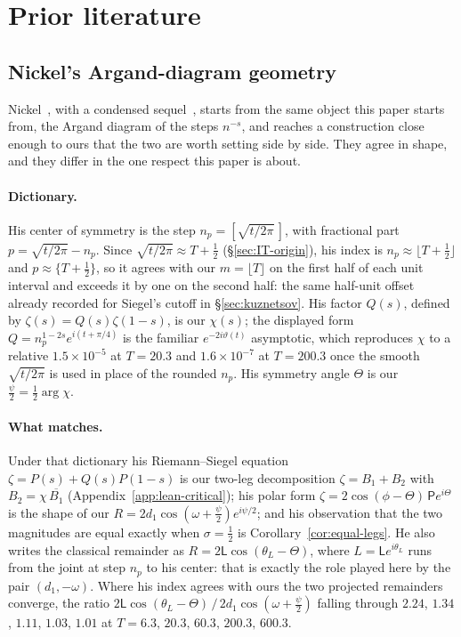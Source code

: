 \documentclass[11pt]{article}
\theoremstyle{definition}
\begin{document}
\section{Prior literature}\label{sec:prior-lit}

\subsection{Nickel's Argand-diagram geometry}\label{sec:nickel}

Nickel~\cite{Nickel2013}, with a condensed sequel~\cite{Nickel2015}, starts
from the same object this paper starts from,
the Argand diagram of the steps $n^{-s}$, and reaches a construction close
enough to ours that the two are worth setting side by side. They agree in
shape, and they differ in the one respect this paper is about.

\paragraph{Dictionary.} His center of symmetry is the step
$n_p=[\sqrt{t/2\pi}\,]$, with fractional part $p=\sqrt{t/2\pi}-n_p$. Since
$\sqrt{t/2\pi}\approx T+\tfrac12$ (\S\ref{sec:IT-origin}), his index is
$n_p\approx\lfloor T+\tfrac12\rfloor$ and $p\approx\{T+\tfrac12\}$, so it
agrees with our $m=\lfloor T\rfloor$ on the first half of each unit interval
and exceeds it by one on the second half: the same half-unit offset already
recorded for Siegel's cutoff in \S\ref{sec:kuznetsov}. His factor $Q(s)$,
defined by $\zeta(s)=Q(s)\zeta(1-s)$, is our $\chi(s)$; the displayed form
$Q=n_p^{1-2s}e^{i(t+\pi/4)}$ is the familiar $e^{-2i\vartheta(t)}$ asymptotic,
which reproduces $\chi$ to a relative $1.5\times10^{-5}$ at $T=20.3$ and
$1.6\times10^{-7}$ at $T=200.3$ once the smooth $\sqrt{t/2\pi}$ is used in
place of the rounded $n_p$. His symmetry angle $\Theta$ is our
$\tfrac{\psi}{2}=\tfrac12\arg\chi$.

\paragraph{What matches.} Under that dictionary his Riemann--Siegel equation
$\zeta=P(s)+Q(s)P(1-s)$ is our two-leg decomposition $\zeta=B_1+B_2$ with
$B_2=\chi\,\overline{B_1}$ (Appendix~\ref{app:lean-critical}); his polar form
$\zeta=2\cos(\phi-\Theta)\,\mathsf{P}e^{i\Theta}$ is the shape of our
$R=2d_1\cos(\omega+\tfrac{\psi}{2})e^{i\psi/2}$; and his observation that the
two magnitudes are equal exactly when $\sigma=\tfrac12$ is
Corollary~\ref{cor:equal-legs}. He also writes the classical remainder as
$R=2\mathsf{L}\cos(\theta_L-\Theta)$, where $L=\mathsf{L}e^{i\theta_L}$ runs
from the joint at step $n_p$ to his center: that is exactly the role played
here by the pair $(d_1,-\omega)$. Where his index agrees with ours the two
projected remainders converge, the ratio
$2\mathsf{L}\cos(\theta_L-\Theta)\,/\,2d_1\cos(\omega+\tfrac{\psi}{2})$
falling through $2.24$, $1.34$, $1.11$, $1.03$, $1.01$ at
$T=6.3,\,20.3,\,60.3,\,200.3,\,600.3$.
\end{document}
